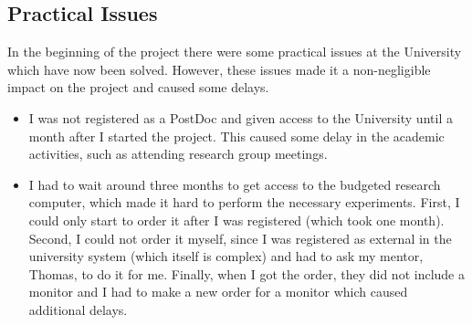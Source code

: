 \documentclass[12pt,a4paper]{article}
\begin{document}
\subsection{Practical Issues}
In the beginning of the project there were some practical issues at the
University which have now been solved. However, these issues made it a
non-negligible impact on the project and caused some delays.
\begin{itemize}
\item I was not registered as a PostDoc and given access to the University until
  a month after I started the project. This caused some delay in the academic
  activities, such as attending research group meetings.
\item I had to wait around three months to get access to the budgeted research
  computer, which made it hard to perform the necessary experiments. First, I
  could only start to order it after I was registered (which took one month).
  Second, I could not order it myself, since I was registered as external in the
  university system (which itself is complex) and had to ask my mentor, Thomas,
  to do it for me. Finally, when I got the order, they did not include a monitor
  and I had to make a new order for a monitor which caused additional delays.
\end{itemize}
\end{document}
